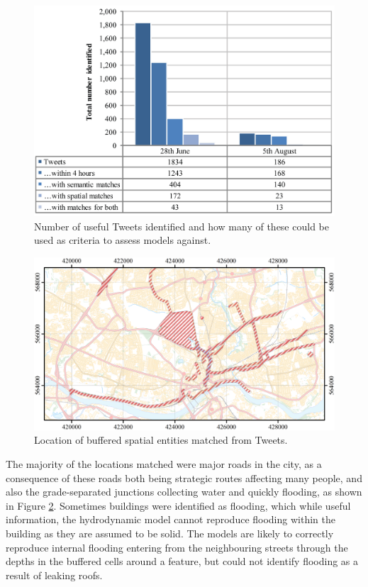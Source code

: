 \begin{figure}[tpb]
	\centering
	\includegraphics[width=1.0\textwidth]{nowcasting-figures/nclsm-tweet-breakdown.png}
	\caption{Number of useful Tweets identified and how many of these could be used as criteria to assess models against.}
	\label{NclSM-Tweet-Breakdown}
\end{figure}

\begin{figure}[tpb]
	\centering
	\includegraphics[width=1.0\textwidth]{nowcasting-figures/nclsm-identified-entities.png}
	\caption{Location of buffered spatial entities matched from Tweets.}
	\label{NclSM-Identified-Entities}
\end{figure}

The majority of the locations matched were major roads in the city, as a consequence of these roads both being strategic routes affecting many people, and also the grade-separated junctions collecting water and quickly flooding, as shown in Figure \ref{NclSM-Identified-Entities}. Sometimes buildings were identified as flooding, which while useful information, the hydrodynamic model cannot reproduce flooding within the building as they are assumed to be solid. The models are likely to correctly reproduce internal flooding entering from the neighbouring streets through the depths in the buffered cells around a feature, but could not identify flooding as a result of leaking roofs. 

